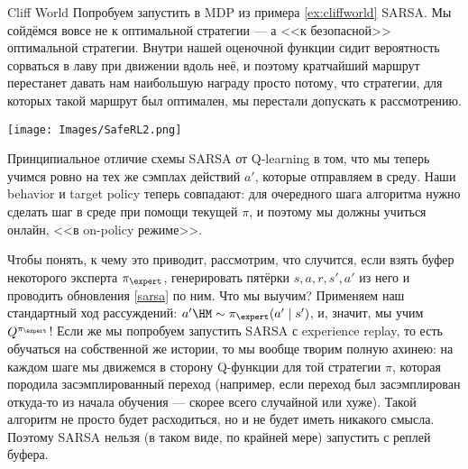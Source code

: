 \begin{exampleBox}[righthand ratio=0.35, sidebyside, sidebyside align=center, lower separated=false]{Cliff World}
Попробуем запустить в MDP из примера \ref{ex:cliffworld} SARSA. Мы сойдёмся вовсе не к оптимальной стратегии --- а <<к безопасной>> оптимальной стратегии. Внутри нашей оценочной функции сидит вероятность сорваться в лаву при движении вдоль неё, и поэтому кратчайший маршрут перестанет давать нам наибольшую награду просто потому, что стратегии, для которых такой маршрут был оптимален, мы перестали допускать к рассмотрению.

\tcblower
\texttt{[image: Images/SafeRL2.png]}
\end{exampleBox}

Принципиальное отличие схемы SARSA от Q-learning в том, что мы теперь учимся ровно на тех же сэмплах действий $a'$, которые отправляем в среду. Наши behavior и target policy теперь совпадают: для очередного шага алгоритма нужно сделать шаг в среде при помощи текущей $\pi$, и поэтому мы должны учиться онлайн, <<в on-policy режиме>>.

Чтобы понять, к чему это приводит, рассмотрим, что случится, если взять буфер некоторого эксперта $\pi_{\expert}$, генерировать пятёрки $s, a, r, s', a'$ из него и проводить обновления \eqref{sarsa} по ним. Что мы выучим? Применяем наш стандартный ход рассуждений: $a' \HM\sim \pi_{\expert}(a' \mid s')$, и, значит, мы учим $Q^{\pi_{\expert}}$! Если же мы попробуем запустить SARSA с experience replay, то есть обучаться на собственной же истории, то мы вообще творим полную ахинею: на каждом шаге мы движемся в сторону Q-функции для той стратегии $\pi$, которая породила засэмплированный переход (например, если переход был засэмплирован откуда-то из начала обучения --- скорее всего случайной или хуже). Такой алгоритм не просто будет расходиться, но и не будет иметь никакого смысла. Поэтому SARSA нельзя (в таком виде, по крайней мере) запустить с реплей буфера.



